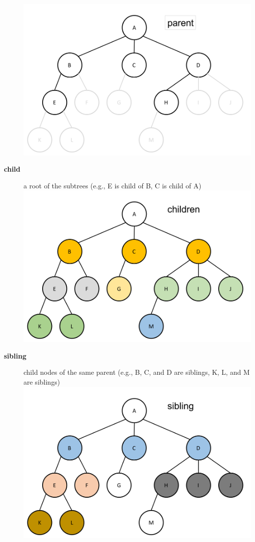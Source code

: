 \documentclass[newPxFont,sthlmFooter,nooffset]{beamer}
\begin{document}
\begin{frame}[t, allowframebreaks]
\begin{description}
\includegraphics[height=0.3\textheight]{./figures/fig02_def_parent.png}
  \item[\textbf{child}] a root of the subtrees (e.g., E is child of B, C is child of A)\\
\includegraphics[height=0.3\textheight]{./figures/fig02_def_children.png}
  \item[\textbf{sibling}] child nodes of the same parent (e.g., B, C, and D are siblings, K, L, and M are siblings)\\
\includegraphics[height=0.3\textheight]{./figures/fig02_def_sibling.png}

\end{description}
\end{frame}
\end{document}
